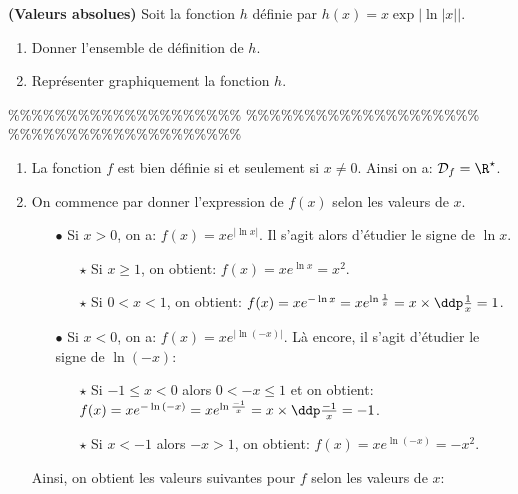 



\begin{exercice}  \;
\textbf{(Valeurs absolues)}
Soit la fonction $h$ d\'efinie par $h(x)=x\exp{|\ln{|x|}|}.$
\begin{enumerate}
 \item 
Donner l'ensemble de d\'efinition de $h$.
\item 
Repr\'esenter graphiquement la fonction $h$.
\end{enumerate}
\end{exercice}


\%\%\%\%\%\%\%\%\%\%\%\%\%\%\%\%\%\%\%\%
\%\%\%\%\%\%\%\%\%\%\%\%\%\%\%\%\%\%\%\%
\%\%\%\%\%\%\%\%\%\%\%\%\%\%\%\%\%\%\%\%



\begin{correction}  \;
\begin{enumerate}
\item La fonction $f$ est bien d\'efinie si et seulement si $x\not= 0$. Ainsi on a: $\mathcal{D}_f=\R^{\star}$.
\item On commence par donner l'expression de $f(x)$ selon les valeurs de $x$. 
\begin{itemize}
\item[$\bullet$] Si $x>0$, on a: $f(x)=xe^{  |  \ln{x} | }$. Il s'agit alors d'\'etudier le signe de $\ln{x}$. 
\begin{itemize}
\item[$\star$] Si $x\geq 1$, on obtient: $f(x)=xe^{\ln{x}}=x^2$.
\item[$\star$] Si $0<x<1$, on obtient: $f(x)=xe^{ -\ln{x} }=xe^{\ln{ \frac{1}{x} }}=x\times \ddp\frac{1}{x}=1$.
\end{itemize}
\item[$\bullet$] Si $x<0$, on a: $f(x)=xe^{ | \ln{(-x)} | }$. L\`{a} encore, il s'agit d'\'etudier le signe de $\ln{(-x)}$:
\begin{itemize}
\item[$\star$] Si $-1 \leq x<0$ alors $0<-x\leq 1$ et on obtient: $f(x)=xe^{-\ln{(-x)}}=xe^{\ln{ \frac{-1}{x} }}=x\times \ddp\frac{-1}{x}=-1$.
\item[$\star$] Si $x<-1$ alors $-x>1$, on obtient: $f(x)=xe^{ \ln{(-x)} }=-x^2$.
\end{itemize}
\end{itemize}
Ainsi, on obtient les valeurs suivantes pour $f$ selon les valeurs de $x$:
\begin{center}
\end{center}

\end{enumerate}
\end{correction}




